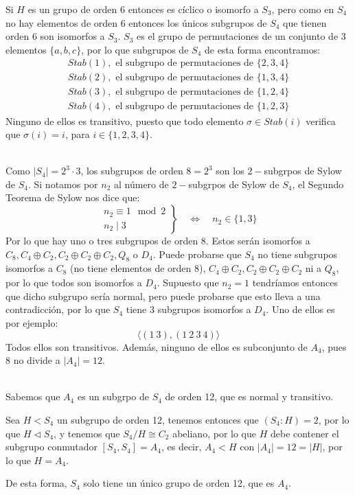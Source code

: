 \begin{description}
        Si $H$ es un grupo de orden 6 entonces es cíclico o isomorfo a $S_3$, pero como en $S_4$ no hay elementos de orden 6 entonces los únicos subgrupos de $S_4$ que tienen orden 6 son isomorfos a $S_3$. $S_3$ es el grupo de permutaciones de un conjunto de 3 elementos $\{a,b,c\}$, por lo que subgrupos de $S_4$ de esta forma encontramos:
        \begin{gather*}
            Stab(1), \text{\ el subgrupo de permutaciones de\ } \{2, 3, 4\} \\
            Stab(2), \text{\ el subgrupo de permutaciones de\ } \{1, 3, 4\} \\
            Stab(3), \text{\ el subgrupo de permutaciones de\ } \{1, 2, 4\} \\
            Stab(4), \text{\ el subgrupo de permutaciones de\ } \{1, 2, 3\}
        \end{gather*}
        Ninguno de ellos es transitivo, puesto que todo elemento $\sigma\in Stab(i)$ verifica que $\sigma(i) = i$, para $i \in \{1,2,3,4\}$.
    \item [Subgrupos de orden 8.]~\\
        Como $|S_4| = 2^3\cdot 3$, los subgrupos de orden $8=2^3$ son los $2-$subgrpos de Sylow de $S_4$. Si notamos por $n_2$ al número de $2-$subgrpos de Sylow de $S_4$, el Segundo Teorema de Sylow nos dice que:
        \begin{equation*}
            \left.\begin{array}{c}
                n_2\equiv 1 \mod 2 \\
                n_2 \mid 3
            \end{array}\right\}  \quad\Longleftrightarrow\quad n_2 \in \{1,3\}
        \end{equation*}
        Por lo que hay uno o tres subgrupos de orden 8. Estos serán isomorfos a $C_8, C_4\oplus C_2, C_2\oplus C_2\oplus C_2, Q_8$ o $D_4$. Puede probarse que $S_4$ no tiene subgrupos isomorfos a $C_8$ (no tiene elementos de orden 8), $C_4\oplus C_2, C_2\oplus C_2\oplus C_2$ ni a $Q_8$, por lo que todos son isomorfos a $D_4$. Supuesto que $n_2 = 1$ tendríamos entonces que dicho subgrupo sería normal, pero puede probarse que esto lleva a una contradicción, por lo que $S_4$ tiene 3 subgrupos isomorfos a $D_4$. Uno de ellos es por ejemplo:
        \begin{equation*}
            \langle (1\ 3), (1\ 2\ 3\ 4) \rangle 
        \end{equation*}
        Todos ellos son transitivos. Además, ninguno de ellos es subconjunto de $A_4$, pues $8$ no divide a $|A_4| = 12$.
    \item [Subgrupos de orden 12.]~\\
        Sabemos que $A_4$ es un subgrpo de $S_4$ de orden 12, que es normal y transitivo.

        Sea $H<S_4$ un subgrupo de orden 12, tenemos entonces que $(S_4:H) = 2$, por lo que $H\lhd S_4$, y tenemos que $S_4/H\cong C_2$ abeliano, por lo que $H$ debe contener el subgrupo conmutador $[S_4,S_4] = A_4$, es decir, $A_4 < H$ con $|A_4| = 12 = |H|$, por lo que $H = A_4$.

        De esta forma, $S_4$ solo tiene un único grupo de orden 12, que es $A_4$.
\end{description}
